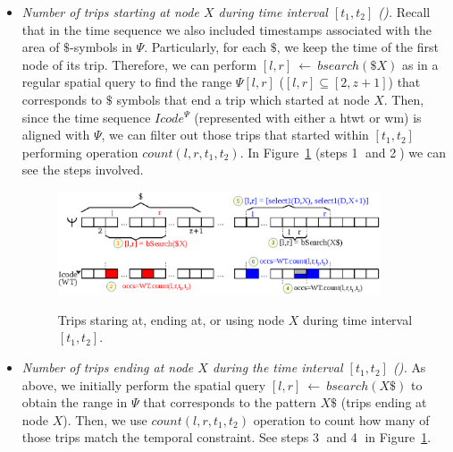	\begin{itemize}[leftmargin=3mm]

		\setlength{\itemindent}{0mm}
		\item {\em Number of trips starting at node $X$ during time interval $[t_1,t_2]$ (\Tswx).}
		Recall that in the time sequence we also included timestamps associated with the area of $\$$-symbols in $\Psi$.
		Particularly, for each $\$$, we keep the time of the first node of its trip. Therefore, 
		we can perform $[l,r]~\leftarrow~bsearch(\$X)$ as in a regular spatial query to find the
		range $\Psi[l,r]$ ($[l,r]\subseteq [2,z+1]$) that corresponds to $\$$ symbols that end a trip
		which started at node $X$. Then, since the time sequence $Icode^{\Psi}$ 
		(represented with either a \gls{htwt} or \gls{wm}) is
		 aligned with $\Psi$, we can filter out those trips that started within $[t_1,t_2]$ performing
		operation $count(l,r,t_1,t_2)$. In Figure~\ref{fig:search2} (steps \textcircled{1} and \textcircled{2}) we can see the steps involved.

	\begin{figure}[thb]
		\begin{center}
			{\includegraphics[width=0.90\textwidth]{figures/search2.eps}}
		\end{center}
		\vspace{-0.3cm}
		\caption{Trips staring at, ending at, or using node $X$  during time interval $[t_1,t_2]$.}
		\label{fig:search2}
	\end{figure}
		
		\item {\em Number of trips ending at node $X$ during the time interval $[t_1,t_2]$ (\Tewx). }
		As above, we initially perform the spatial query $[l,r]~\leftarrow~bsearch(X\$)$ to 
		obtain the range in $\Psi$ that corresponds to the pattern $X\$$ (trips ending at node $X$).
		Then, we use  $count(l,r,t_1,t_2)$ operation to count how many of those trips match the temporal constraint.
		See steps \textcircled{3} and \textcircled{4} in Figure~\ref{fig:search2}.
		

\end{itemize}
